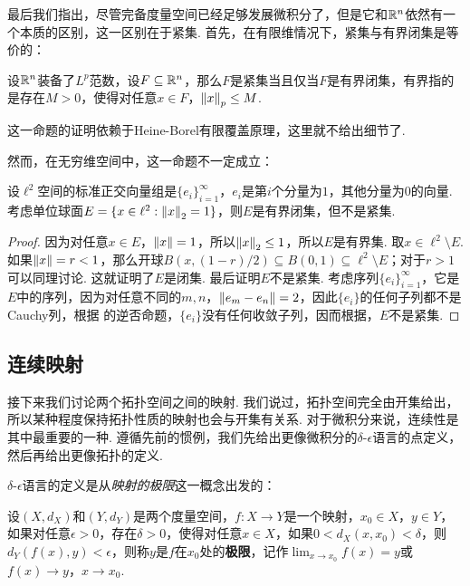 最后我们指出，尽管完备度量空间已经足够发展微积分了，但是它和$\mathbb{R}^n$依然有一个本质的区别，这一区别在于紧集. 首先，在有限维情况下，紧集与有界闭集是等价的：

\begin{proposition}\label{prop:compact-bounded}
设$\mathbb{R}^n$装备了$L^p$范数，设$F\subseteq\mathbb{R}^n$，那么$F$是紧集当且仅当$F$是有界闭集，有界指的是存在$M>0$，使得对任意$x\in F$，$\left\|x\right\|_p\leq M$.
\end{proposition}

这一命题的证明依赖于Heine-Borel有限覆盖原理，这里就不给出细节了. 

然而，在无穷维空间中，这一命题不一定成立：

\begin{proposition}\label{prop:compact-not-bounded}
设$\ell^2$空间的标准正交向量组是$\{e_i\}_{i=1}^\infty$，$e_i$是第$i$个分量为$1$，其他分量为$0$的向量. 考虑单位球面$E=\{x\in\ell^2:\left\|x\right\|_2=1\}$，则$E$是有界闭集，但不是紧集. 
\end{proposition}
\begin{proof}
    因为对任意$x\in E$，$\left\|x\right\|=1$，所以$\left\|x\right\|_2\leq 1$，所以$E$是有界集. 取$x\in\ell^2\setminus E$. 如果$\left\|x\right\|=r<1$，那么开球$B(x,(1-r)/2)\subseteq B(0,1)\subseteq \ell^2\setminus E$；对于$r>1$可以同理讨论. 这就证明了$E$是闭集. 最后证明$E$不是紧集. 考虑序列$\{e_i\}_{i=1}^\infty$，它是$E$中的序列，因为对任意不同的$m,n$，$\left\|e_m-e_n\right\|=2$，因此$\{e_i\}$的任何子列都不是Cauchy列，根据 的逆否命题，$\{e_i\}$没有任何收敛子列，因而根据，$E$不是紧集. 
\end{proof}

\subsection{连续映射}
接下来我们讨论两个拓扑空间之间的映射. 我们说过，拓扑空间完全由开集给出，所以某种程度保持拓扑性质的映射也会与开集有关系. 对于微积分来说，连续性是其中最重要的一种. 遵循先前的惯例，我们先给出更像微积分的$\delta$-$\epsilon$语言的点定义，然后再给出更像拓扑的定义. 

$\delta$-$\epsilon$语言的定义是从\emph{映射的极限}这一概念出发的：

\begin{definition}[映射的极限]
    设$(X,d_X)$和$(Y,d_Y)$是两个度量空间，$f:X\to Y$是一个映射，$x_0\in X$，$y\in Y$，如果对任意$\epsilon>0$，存在$\delta>0$，使得对任意$x\in X$，如果$0<d_X(x,x_0)<\delta$，则$d_Y(f(x),y)<\epsilon$，则称$y$是$f$在$x_0$处的\textbf{极限}，记作$\lim_{x\to x_0}f(x)=y$或$f(x)\to y$，$x\to x_0$.
\end{definition}


